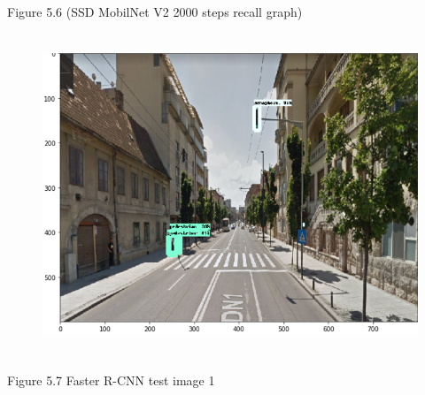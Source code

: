 \documentclass[12pt]{report}
\renewcommand{\_}{\kern-1.5pt\textunderscore\kern-1.5pt}
\begin{document}

\par

\begin{FlushRight}
Figure 5.6 (SSD MobilNet V2 2000 steps recall graph)
\end{FlushRight}\par


\vspace{\baselineskip}



\begin{figure}[H]
	\begin{Center}
		\includegraphics[width=5.01in,height=3.8in]{./media/image5.png}
	\end{Center}
\end{figure}



\par

\begin{Center}
Figure 5.7 Faster R-CNN test image 1
\end{Center}\par


\vspace{\baselineskip}


\end{document}
